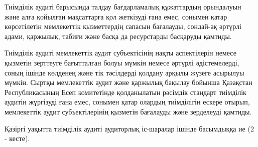 \begin{multicols}{2}
Тиімділік аудиті барысында талдау бағдарламалық құжаттардың орындалуын
және алға қойылған мақсаттарға қол жеткізуді ғана емес, сонымен қатар
көрсетілетін мемлекеттік қызметтердің сапасын бағалауды, сондай-ақ
әртүрлі адами, қаржылық, табиғи және басқа да ресурстарды басқаруды
қамтиды.

Тиімділік аудиті мемлекеттік аудит субъектісінің нақты аспектілерін
немесе қызметін зерттеуге бағытталған болуы мүмкін немесе әртүрлі
әдістемелерді, соның ішінде көлденең және тік тәсілдерді қолдану арқылы
жүзеге асырылуы мүмкін. Сыртқы мемлекеттік аудит және қаржылық бақылау
бойынша Қазақстан Республикасының Есеп комитетінде қолданылатын рәсімдік
стандарт тиімділік аудитін жүргізуді ғана емес, сонымен қатар олардың
тиімділігін ескере отырып, мемлекеттік аудит субъектілерінің қызметін
бағалауды және зерделеуді қамтиды.

Қазіргі уақытта тиімділік аудиті аудиторлық іс-шаралар ішінде басымдыққа
ие (2 - кесте).
\end{multicols}

